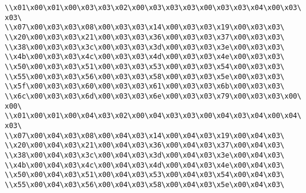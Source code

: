 \verb|\\x01\x00\x01\x00\x03\x03\x02\x00\x03\x03\x03\x00\x03\x03\x04\x00\x03\x03\|\newline
\verb|\\x07\x00\x03\x03\x08\x00\x03\x03\x14\x00\x03\x03\x19\x00\x03\x03\|\newline
\verb|\\x20\x00\x03\x03\x21\x00\x03\x03\x36\x00\x03\x03\x37\x00\x03\x03\|\newline
\verb|\\x38\x00\x03\x03\x3c\x00\x03\x03\x3d\x00\x03\x03\x3e\x00\x03\x03\|\newline
\verb|\\x4b\x00\x03\x03\x4c\x00\x03\x03\x4d\x00\x03\x03\x4e\x00\x03\x03\|\newline
\verb|\\x50\x00\x03\x03\x51\x00\x03\x03\x53\x00\x03\x03\x54\x00\x03\x03\|\newline
\verb|\\x55\x00\x03\x03\x56\x00\x03\x03\x58\x00\x03\x03\x5e\x00\x03\x03\|\newline
\verb|\\x5f\x00\x03\x03\x60\x00\x03\x03\x61\x00\x03\x03\x6b\x00\x03\x03\|\newline
\verb|\\x6c\x00\x03\x03\x6d\x00\x03\x03\x6e\x00\x03\x03\x79\x00\x03\x03\x00\x00\|\newline
\verb|\\x01\x00\x01\x00\x04\x03\x02\x00\x04\x03\x03\x00\x04\x03\x04\x00\x04\x03\|\newline
\verb|\\x07\x00\x04\x03\x08\x00\x04\x03\x14\x00\x04\x03\x19\x00\x04\x03\|\newline
\verb|\\x20\x00\x04\x03\x21\x00\x04\x03\x36\x00\x04\x03\x37\x00\x04\x03\|\newline
\verb|\\x38\x00\x04\x03\x3c\x00\x04\x03\x3d\x00\x04\x03\x3e\x00\x04\x03\|\newline
\verb|\\x4b\x00\x04\x03\x4c\x00\x04\x03\x4d\x00\x04\x03\x4e\x00\x04\x03\|\newline
\verb|\\x50\x00\x04\x03\x51\x00\x04\x03\x53\x00\x04\x03\x54\x00\x04\x03\|\newline
\verb|\\x55\x00\x04\x03\x56\x00\x04\x03\x58\x00\x04\x03\x5e\x00\x04\x03\|\newline
